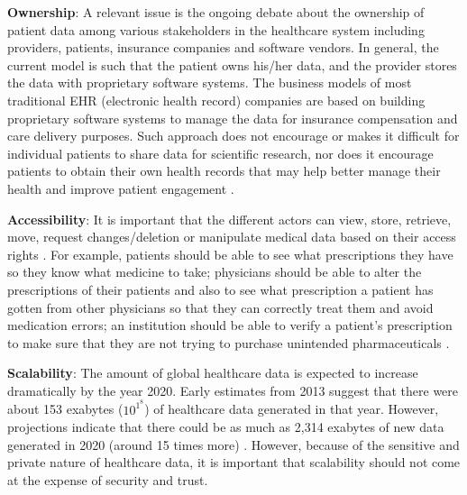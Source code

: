 \textbf{Ownership}: A relevant issue is the ongoing debate about the ownership of patient data among various stakeholders in the healthcare system including providers, patients, insurance companies and software vendors. In general, the current model is such that the patient owns his/her data, and the provider stores the data with proprietary software systems. The business models of most traditional EHR (electronic health record) companies are based on building proprietary software systems to manage the data for insurance compensation and care delivery purposes. Such approach does not encourage or makes it difficult for individual patients to share data for scientific research, nor does it encourage patients to obtain their own health records that may help better manage their health and improve patient engagement \cite{health_ownership}. \newline

\textbf{Accessibility}: It is important that the different actors can view, store, retrieve, move, request changes/deletion or manipulate medical data based on their access rights \cite{req_health3}. For example, patients should be able to see what prescriptions they have so they know what medicine to take; physicians should be able to alter the prescriptions of their patients and also to see what prescription a patient has gotten from other physicians so that they can correctly treat them and avoid medication errors; an institution should be able to verify a patient's prescription to make sure that they are not trying to purchase unintended pharmaceuticals \cite[Priv]{req_h_priv}. \newline

\textbf{Scalability}: The amount of global healthcare data is expected to increase dramatically by the year 2020. Early estimates from 2013 suggest that there were about 153 exabytes ($10^1^8$) of healthcare data generated in that year. However, projections indicate that there could be as much as 2,314 exabytes of new data generated in 2020 (around 15 times more) \cite{health_scale}. However, because of the sensitive and private nature of healthcare data, it is important that scalability should not come at the expense of security and trust. \newline

